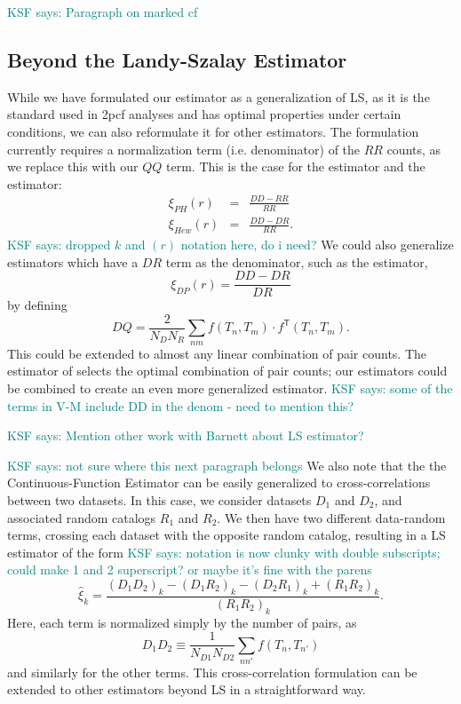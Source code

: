 \documentclass[modern]{aastex62}
\newcommand{\cf}{2pcf\xspace} %
\newcommand{\est}{the Continuous-Function Estimator\xspace}
\newcommand{\LS}{LS\xspace}
\newcommand{\T}{^{\mathsf{T}}}
\newcommand{\KSF}[1]{\textcolor{teal}{KSF says: #1}}
\begin{document}
\KSF{Paragraph on marked cf}

\label{ref:beyondls}
\subsection{Beyond the Landy-Szalay Estimator}

While we have formulated our estimator as a generalization of \LS, as it is the standard used in \cf analyses and has optimal properties under certain conditions, we can also reformulate it for other estimators.
The formulation currently requires a normalization term (i.e. denominator) of the $RR$ counts, as we replace this with our $QQ$ term.
This is the case for the \cite{PeeblesHauser1974} estimator and the \cite{Hewett1982} estimator:
\begin{eqnarray}
    \xi_{PH}(r) &=& \frac{DD - RR}{RR} \\
    \xi_{Hew}(r) &=& \frac{DD - DR}{RR}.
\end{eqnarray}
\KSF{dropped $k$ and $(r)$ notation here, do i need?}
We could also generalize estimators which have a $DR$ term as the denominator, such as the \cite{DavisPeebles1983} estimator,
\begin{equation}
    \xi_{DP}(r) = \frac{DD - DR}{DR}
\end{equation}
by defining
\begin{equation}
    DQ = \frac{2}{N_D N_R} \sum_{n m} f(T_n, T_m) \cdot f\T(T_n, T_m).
\end{equation}
This could be extended to almost any linear combination of pair counts.
The estimator of \cite{VargasMagana2013} selects the optimal combination of pair counts; our estimators could be combined to create an even more generalized estimator.
\KSF{some of the terms in V-M include DD in the denom - need to mention this?}

\KSF{Mention other work with Barnett about LS estimator?}

\KSF{not sure where this next paragraph belongs}
We also note that the \est can be easily generalized to cross-correlations between two datasets.
In this case, we consider datasets $D_1$ and $D_2$, and associated random catalogs $R_1$ and $R_2$. 
We then have two different data-random terms, crossing each dataset with the opposite random catalog, resulting in a \LS estimator of the form
\KSF{notation is now clunky with double subscripts; could make 1 and 2 superscript? or maybe it's fine with the parens}
\begin{equation}
    \hat{\xi}_k = \frac{(D_1 D_2)_k - (D_1 R_2)_k - (D_2 R_1)_k + (R_1 R_2)_k}{(R_1 R_2)_k}.
\end{equation}
Here, each term is normalized simply by the number of pairs, as
\begin{equation}
    D_1 D_2 \equiv \frac{1}{N_{D1} N_{D2}} \sum_{n n'} f(T_n, T_{n'})
\end{equation}
and similarly for the other terms.
This cross-correlation formulation can be extended to other estimators beyond \LS in a straightforward way.
\end{document}
